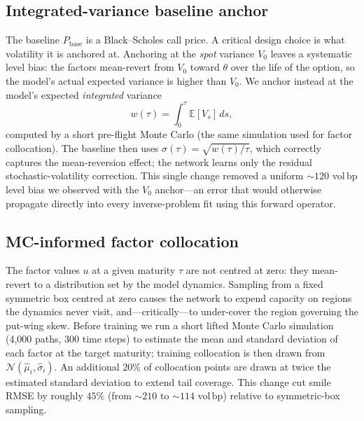 \documentclass[preprint,12pt]{elsarticle}
\newcommand{\bp}{\ensuremath{\,\mathrm{bp}}}
\begin{document}
\subsection{Integrated-variance baseline anchor}
\label{sec:baseline}
The baseline $P_{\mathrm{base}}$ is a Black--Scholes call price. A critical
design choice is what volatility it is anchored at. Anchoring at the
\emph{spot} variance $V_0$ leaves a systematic level bias: the factors
mean-revert from $V_0$ toward $\theta$ over the life of the option, so the
model's actual expected variance is higher than $V_0$. We anchor instead at the
model's expected \emph{integrated} variance
\begin{equation}
  w(\tau) = \int_0^\tau \mathbb{E}[V_s]\,ds,
  \label{eq:intvar}
\end{equation}
computed by a short pre-flight Monte Carlo (the same simulation used for factor
collocation). The baseline then uses $\sigma(\tau) = \sqrt{w(\tau)/\tau}$, which
correctly captures the mean-reversion effect; the network learns only the
residual stochastic-volatility correction. This single change removed a uniform
${\sim}120$ vol\bp{} level bias we observed with the $V_0$ anchor---an error that
would otherwise propagate directly into every inverse-problem fit using this
forward operator.

\subsection{MC-informed factor collocation}
\label{sec:mcsamp}
The factor values $u$ at a given maturity $\tau$ are not centred at zero: they
mean-revert to a distribution set by the model dynamics. Sampling from a fixed
symmetric box centred at zero causes the network to expend capacity on regions
the dynamics never visit, and---critically---to under-cover the region governing
the put-wing skew. Before training we run a short lifted Monte Carlo simulation
(4,000 paths, 300 time steps) to estimate the mean and standard deviation of each
factor at the target maturity; training collocation is then drawn from
$\mathcal{N}(\hat{\mu}_i, \hat{\sigma}_i)$. An additional 20\% of collocation
points are drawn at twice the estimated standard deviation to extend tail
coverage. This change cut smile RMSE by roughly $45\%$ (from ${\sim}210$ to
${\sim}114$ vol\bp) relative to symmetric-box sampling.
\end{document}
